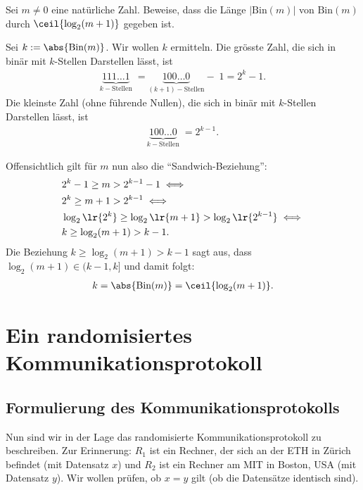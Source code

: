 	\begin{myexercise}
		Sei $m \neq 0$ eine natürliche Zahl. Beweise, dass die Länge $|\text{Bin}(m)|$ von $\text{Bin}(m)$ durch $\ceil{\log_2(m+1)}$ gegeben ist.
		\begin{myanswer}
			Sei $k := \abs{\text{Bin}(m)}$. Wir wollen $k$ ermitteln. Die grösste Zahl, die sich in binär mit $k$-Stellen Darstellen lässt, ist
			\begin{align*}
				\underbrace{111\ldots 1}_{k-\text{Stellen}}\; =
				\underbrace{100\ldots 0}_{(k+1)-\text{Stellen}} -\; 1 = 2^k - 1.
			\end{align*}
			Die kleinste Zahl (ohne führende Nullen), die sich in binär mit $k$-Stellen Darstellen lässt, ist
			\begin{align*}
				\underbrace{100\ldots 0}_{k-\text{Stellen}}\; = 2^{k-1}.
			\end{align*}

			Offensichtlich gilt für $m$ nun also die \enquote{Sandwich-Beziehung}:
			\begin{align*}
				 & 2^k-1 \geq m > 2^{k-1} - 1 \iff                              \\
				 & 2^k \geq m+1 > 2^{k-1} \iff                                  \\
				 & \log_2\lr{2^k} \geq \log_2\lr{m+1} > \log_2\lr{2^{k-1}} \iff \\
				 & k \geq \log_2(m+1) > k-1.
			\end{align*}
			Die Beziehung $k \geq \log_2(m+1) > k-1$ sagt aus, dass $\log_2(m+1)\in (k-1,k]$ und damit folgt:
			\begin{align*}
				k = \abs{\text{Bin}(m)} = \ceil{\log_2(m+1)}.
			\end{align*}
		\end{myanswer}
	\end{myexercise}


	\clearpage
	\section{Ein randomisiertes Kommunikationsprotokoll}

	\subsection{Formulierung des Kommunikationsprotokolls}
	Nun sind wir in der Lage das randomisierte Kommunikationsprotokoll zu beschreiben.
	Zur Erinnerung: $R_1$ ist ein Rechner, der sich an der ETH in Zürich befindet (mit Datensatz $x$) und $R_2$ ist ein Rechner am MIT in Boston, USA (mit Datensatz $y$).
	Wir wollen prüfen, ob $x = y$ gilt (ob die Datensätze identisch sind).

